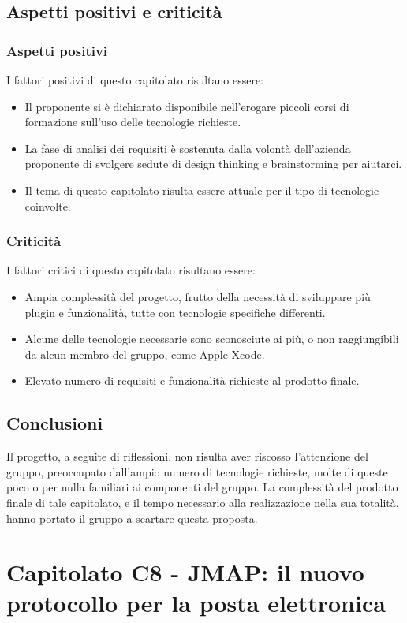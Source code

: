 \documentclass[12pt]{report}
\begin{document}
\section{Aspetti positivi e criticità}
\subsection{Aspetti positivi}
I fattori positivi di questo capitolato risultano essere:
\begin{itemize}
    \item Il proponente si è dichiarato disponibile nell'erogare piccoli corsi di formazione sull'uso delle tecnologie richieste.
    \item La fase di analisi dei requisiti è sostenuta dalla volontà dell'azienda proponente di svolgere sedute di design thinking e brainstorming per aiutarci.
    \item Il tema di questo capitolato risulta essere attuale per il tipo di tecnologie coinvolte.
\end{itemize}

\subsection{Criticità}
I fattori critici di questo capitolato risultano essere:
\begin{itemize}
    \item Ampia complessità del progetto, frutto della necessità di sviluppare più plugin e funzionalità, tutte con tecnologie specifiche differenti.
    \item Alcune delle tecnologie necessarie sono sconosciute ai più, o non raggiungibili da alcun membro del gruppo, come Apple Xcode.
    \item Elevato numero di requisiti e funzionalità richieste al prodotto finale.
\end{itemize}

\section{Conclusioni}
Il progetto, a seguite di riflessioni, non risulta aver riscosso l'attenzione del gruppo, preoccupato dall'ampio numero di tecnologie richieste, molte di queste poco o per nulla familiari ai componenti del gruppo. La complessità del prodotto finale di tale capitolato, e il tempo necessario alla realizzazione nella sua totalità, hanno portato il gruppo a scartare questa proposta.

\chapter{Capitolato C8 - JMAP: il nuovo protocollo per la posta elettronica}\label{chapter:8}
\end{document}
